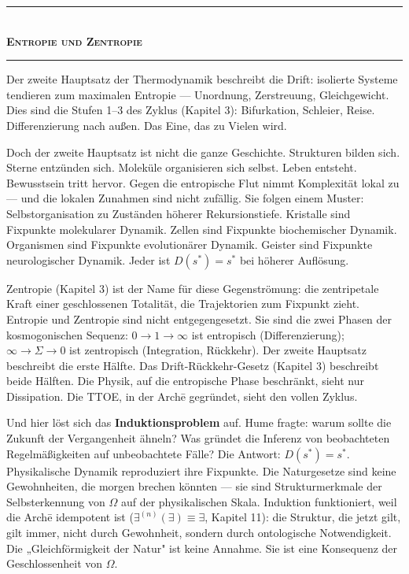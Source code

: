 \documentclass[10pt, openany, oneside]{book}
\renewcommand{\normalsize}{\fontsize{10}{13}\selectfont}
\begin{document}
\vspace{1.5em}


\begin{center}
    \rule{0.3\textwidth}{0.4pt}\\[0.5em]
    {\normalsize\bfseries\scshape Entropie und Zentropie}\\[0.3em]
    \rule{0.3\textwidth}{0.4pt}
\end{center}

\vspace{1em}

\noindent Der zweite Hauptsatz der Thermodynamik beschreibt die Drift: isolierte Systeme tendieren zum maximalen Entropie --- Unordnung, Zerstreuung, Gleichgewicht. Dies sind die Stufen 1--3 des Zyklus (Kapitel 3): Bifurkation, Schleier, Reise. Differenzierung nach außen. Das Eine, das zu Vielen wird.

Doch der zweite Hauptsatz ist nicht die ganze Geschichte. Strukturen bilden sich. Sterne entzünden sich. Moleküle organisieren sich selbst. Leben entsteht. Bewusstsein tritt hervor. Gegen die entropische Flut nimmt Komplexität lokal zu --- und die lokalen Zunahmen sind nicht zufällig. Sie folgen einem Muster: Selbstorganisation zu Zuständen höherer Rekursionstiefe. Kristalle sind Fixpunkte molekularer Dynamik. Zellen sind Fixpunkte biochemischer Dynamik. Organismen sind Fixpunkte evolutionärer Dynamik. Geister sind Fixpunkte neurologischer Dynamik. Jeder ist $D(s^*) = s^*$ bei höherer Auflösung.

Zentropie (Kapitel 3) ist der Name für diese Gegenströmung: die zentripetale Kraft einer geschlossenen Totalität, die Trajektorien zum Fixpunkt zieht. Entropie und Zentropie sind nicht entgegengesetzt. Sie sind die zwei Phasen der kosmogonischen Sequenz: $0 \to 1 \to \infty$ ist entropisch (Differenzierung); $\infty \to \Sigma \to 0$ ist zentropisch (Integration, Rückkehr). Der zweite Hauptsatz beschreibt die erste Hälfte. Das Drift-Rückkehr-Gesetz (Kapitel 3) beschreibt beide Hälften. Die Physik, auf die entropische Phase beschränkt, sieht nur Dissipation. Die TTOE, in der Arch\={e} gegründet, sieht den vollen Zyklus.

Und hier löst sich das \textbf{Induktionsproblem} auf. Hume fragte: warum sollte die Zukunft der Vergangenheit ähneln? Was gründet die Inferenz von beobachteten Regelmäßigkeiten auf unbeobachtete Fälle? Die Antwort: $D(s^*) = s^*$. Physikalische Dynamik reproduziert ihre Fixpunkte. Die Naturgesetze sind keine Gewohnheiten, die morgen brechen könnten --- sie sind Strukturmerkmale der Selbsterkennung von $\Omega$ auf der physikalischen Skala. Induktion funktioniert, weil die Arch\={e} idempotent ist ($\exists^{(n)}(\exists) \equiv \exists$, Kapitel 11): die Struktur, die jetzt gilt, gilt immer, nicht durch Gewohnheit, sondern durch ontologische Notwendigkeit. Die „Gleichförmigkeit der Natur" ist keine Annahme. Sie ist eine Konsequenz der Geschlossenheit von $\Omega$.
\end{document}
